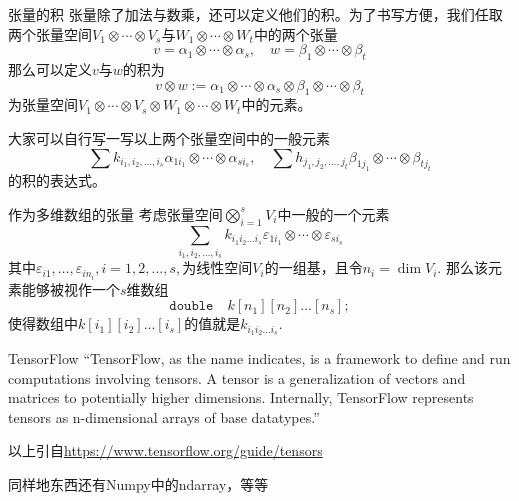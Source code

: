 
\begin{frame}

\begin{block}{张量的积}
张量除了加法与数乘，还可以定义他们的积。为了书写方便，我们任取两个张量空间$V_1\otimes\cdots\otimes V_s$与$W_1\otimes\cdots\otimes W_t$中的两个张量
\[v = \alpha_1\otimes\cdots\otimes \alpha_s, \quad w = \beta_1\otimes\cdots\otimes \beta_t\]
那么可以定义$v$与$w$的积为
\[v\otimes w := \alpha_1\otimes\cdots\otimes \alpha_s \otimes \beta_1\otimes\cdots\otimes \beta_t\]
为张量空间$V_1\otimes\cdots\otimes V_s\otimes W_1\otimes\cdots\otimes W_t$中的元素。

\vspace{2em}
\pause

大家可以自行写一写以上两个张量空间中的一般元素
\[\sum k_{i_1,i_2,\ldots,i_s}\alpha_{1i_1} \otimes \cdots \otimes \alpha_{si_s}, \quad \sum h_{j_1,j_2,\ldots,j_t}\beta_{1j_1} \otimes \cdots \otimes \beta_{tj_t}\]
的积的表达式。
\end{block}

\end{frame}


\begin{frame}

\begin{block}{作为多维数组的张量}
考虑张量空间$\bigotimes\limits_{i=1}^s V_i$中一般的一个元素
\[\sum\limits_{i_1,i_2,\ldots,i_s} k_{i_1i_2\ldots i_s} \varepsilon_{1i_1} \otimes \cdots \otimes \varepsilon_{si_s}\]
其中$\varepsilon_{i1},\ldots,\varepsilon_{in_i}, i=1,2,\ldots,s,$为线性空间$V_i $的一组基，且令$n_i = \dim V_i$. 那么该元素能够被视作一个$s$维数组
\[
\texttt{double} \quad k[n_1][n_2]...[n_s];
\]
使得数组中$k[i_1][i_2]...[i_s]$的值就是$k_{i_1i_2\ldots i_s}$.
\end{block}

\end{frame}


\begin{frame}

\begin{block}{\Large TensorFlow}
\vspace{1em}
{
\large
``TensorFlow, as the name indicates, is a framework to define and run computations involving tensors. A tensor is a generalization of vectors and matrices to potentially higher dimensions. Internally, TensorFlow represents tensors as n-dimensional arrays of base datatypes.''
}

\vspace{1em}

以上引自\href{https://www.tensorflow.org/guide/tensors}{https://www.tensorflow.org/guide/tensors}

\vspace{2em}
\pause

同样地东西还有Numpy中的ndarray，等等
\end{block}

\end{frame}

